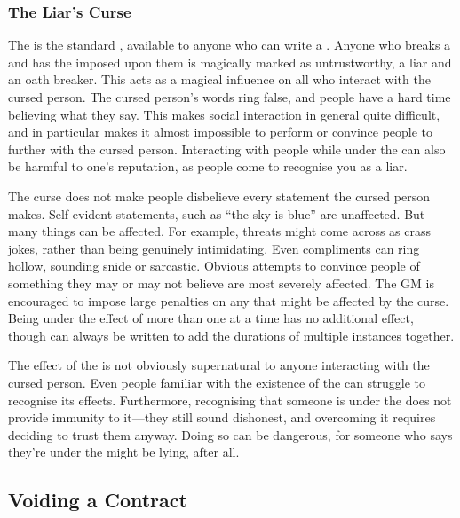 \subsubsection{The Liar's Curse}

The {\liarscurse} is the standard {\contractpenalty}, available to anyone who can write a {\contract}.
Anyone who breaks a {\contract} and has the {\liarscurse} imposed upon them is magically marked as untrustworthy, a liar and an oath breaker.
This acts as a magical influence on all who interact with the cursed person.
The cursed person's words ring false, and people have a hard time believing what they say.
This makes social interaction in general quite difficult, and in particular makes it almost impossible to perform  or convince people to {\sign} further {\contracts} with the cursed person.
Interacting with people while under the {\liarscurse} can also be harmful to one's reputation, as people come to recognise you as a liar.

The curse does not make people disbelieve every statement the cursed person makes.
Self evident statements, such as ``the sky is blue'' are unaffected.
But many things can be affected.
For example, threats might come across as crass jokes, rather than being genuinely intimidating.
Even compliments can ring hollow, sounding snide or sarcastic.
Obvious attempts to convince people of something they may or may not believe are most severely affected.
The GM is encouraged to impose large penalties on any {\tests} that might be affected by the curse.
Being under the effect of more than one {\liarscurse} at a time has no additional effect, though {\contracts} can always be written to add the durations of multiple instances together.

The effect of the {\liarscurse} is not obviously supernatural to anyone interacting with the cursed person.
Even people familiar with the existence of the {\liarscurse} can struggle to recognise its effects.
Furthermore, recognising that someone is under the {\liarscurse} does not provide immunity to it---they still sound dishonest, and overcoming it requires deciding to trust them anyway.
Doing so can be dangerous, for someone who says they're under the {\liarscurse} might be lying, after all.

\subsection{Voiding a Contract}

